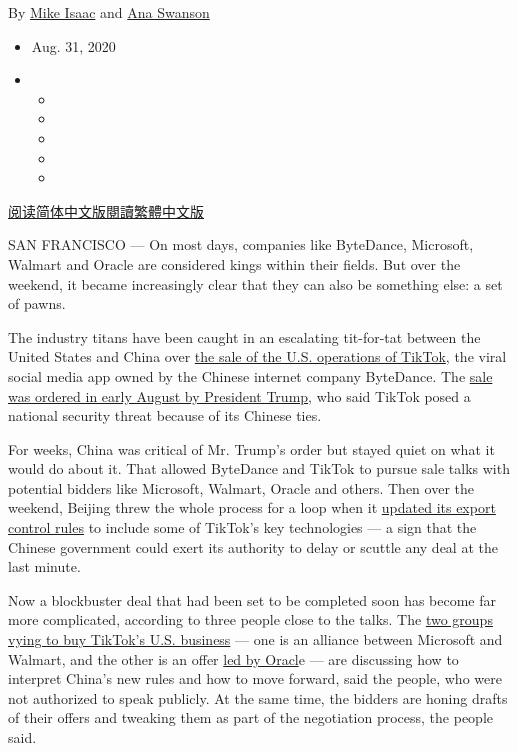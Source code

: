 By \href{https://www.nytimes3xbfgragh.onion/by/mike-isaac}{Mike Isaac}
and \href{https://www.nytimes3xbfgragh.onion/by/ana-swanson}{Ana
Swanson}

\begin{itemize}
\item
  Aug. 31, 2020
\item
  \begin{itemize}
  \item
  \item
  \item
  \item
  \item
  \end{itemize}
\end{itemize}

\href{https://cn.nytimes3xbfgragh.onion/technology/20200901/tiktok-export-us-china/}{阅读简体中文版}\href{https://cn.nytimes3xbfgragh.onion/technology/20200901/tiktok-export-us-china/zh-hant/}{閱讀繁體中文版}

SAN FRANCISCO --- On most days, companies like ByteDance, Microsoft,
Walmart and Oracle are considered kings within their fields. But over
the weekend, it became increasingly clear that they can also be
something else: a set of pawns.

The industry titans have been caught in an escalating tit-for-tat
between the United States and China over
\href{https://www.nytimes3xbfgragh.onion/2020/08/26/technology/tiktoks-microsoft-deal-soap-opera-trump.html}{the
sale of the U.S. operations of TikTok}, the viral social media app owned
by the Chinese internet company ByteDance. The
\href{https://www.nytimes3xbfgragh.onion/2020/08/06/technology/trump-wechat-tiktok-china.html}{sale
was ordered in early August by President Trump}, who said TikTok posed a
national security threat because of its Chinese ties.

For weeks, China was critical of Mr. Trump's order but stayed quiet on
what it would do about it. That allowed ByteDance and TikTok to pursue
sale talks with potential bidders like Microsoft, Walmart, Oracle and
others. Then over the weekend, Beijing threw the whole process for a
loop when it
\href{https://www.nytimes3xbfgragh.onion/2020/08/29/technology/china-tiktok-export-controls.html}{updated
its export control rules} to include some of TikTok's key technologies
--- a sign that the Chinese government could exert its authority to
delay or scuttle any deal at the last minute.

Now a blockbuster deal that had been set to be completed soon has become
far more complicated, according to three people close to the talks. The
\href{https://www.nytimes3xbfgragh.onion/2020/08/27/technology/walmart-tiktok-deal.html}{two
groups vying to buy TikTok's U.S. business} --- one is an alliance
between Microsoft and Walmart, and the other is an offer
\href{https://www.nytimes3xbfgragh.onion/2020/08/19/technology/trump-oracle-tiktok.html}{led
by Oracl}e --- are discussing how to interpret China's new rules and how
to move forward, said the people, who were not authorized to speak
publicly. At the same time, the bidders are honing drafts of their
offers and tweaking them as part of the negotiation process, the people
said.

